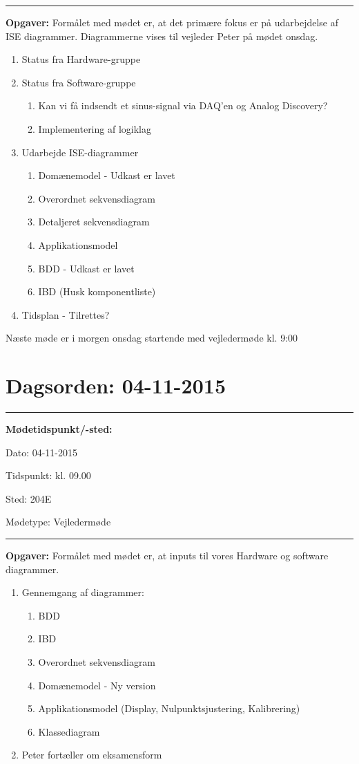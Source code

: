 \hrule
\textbf{Opgaver:} \newline
Formålet med mødet er, at det primære fokus er på udarbejdelse af ISE diagrammer. Diagrammerne vises til vejleder Peter på mødet onsdag.
\begin{enumerate}
\item Status fra Hardware-gruppe

\item Status fra Software-gruppe
\begin{enumerate}
\item Kan vi få indsendt et sinus-signal via DAQ'en og Analog Discovery?
\item Implementering af logiklag
\end{enumerate}

\item Udarbejde ISE-diagrammer
\begin{enumerate}
\item Domænemodel - Udkast er lavet
\item Overordnet sekvensdiagram
\item Detaljeret sekvensdiagram
\item Applikationsmodel
\item BDD - Udkast er lavet
\item IBD (Husk komponentliste)
\end{enumerate}
\item Tidsplan - Tilrettes?
\end{enumerate}
Næste møde er i morgen onsdag startende med vejledermøde kl. 9:00

\newpage
\section{Dagsorden: 04-11-2015}
\hrule



\textbf{Mødetidspunkt/-sted:} 

Dato: \tabto{7em} 04-11-2015

Tidspunkt: \tabto{7em} kl. 09.00

Sted: \tabto{7em} 204E

Mødetype: \tabto{7em} Vejledermøde \newline


\hrule
\textbf{Opgaver:} \newline
Formålet med mødet er, at inputs til vores Hardware og software diagrammer.
\begin{enumerate}
\item Gennemgang af diagrammer:
\begin{enumerate}
\item BDD
\item IBD
\item Overordnet sekvensdiagram
\item Domænemodel - Ny version
\item Applikationsmodel (Display, Nulpunktsjustering, Kalibrering)
\item Klassediagram
\end{enumerate}
\item Peter fortæller om eksamensform
\end{enumerate}